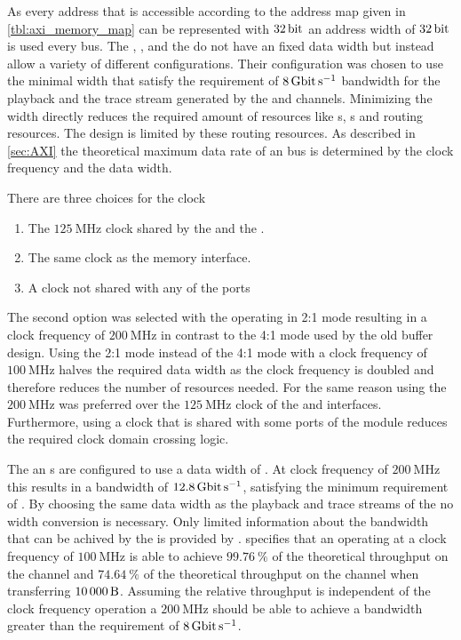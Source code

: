 As every address that is accessible according to the address map given in \autoref{tbl:axi_memory_map} can be represented with $\SI{32}{\bit}$ an address width of $\SI{32}{\bit}$ is used every \AXI{} bus.
The \AXIDMA{}, \XilinxMIG{}, \smartconnect{} and the \AXIBRAMController{} do not have an fixed \AXI{} data width but instead allow a variety of different configurations.
Their configuration was chosen to use the minimal width that satisfy the requirement of $\pbExecBandwidth{}$ bandwidth for the playback and the trace stream generated by the \MMToS{} and \SToMM{} channels. Minimizing the width directly reduces the required amount of \FPGA{} resources like \LUT{}s, \FF{}s and routing resources. The \FPGA{} design is limited by these routing resources\autocite{ref:fpga_routing_limited}.
As described in \autoref{sec:AXI} the theoretical maximum data rate of an \AXI{} bus is determined by the clock frequency and the data width.

There are three choices for the clock
\begin{enumerate}
    \item The $\SI{125}{\mega\hertz}$ clock shared by the \HostARQ{} and the \pbexec{}.
    \item The same clock as the \XilinxMIG{} memory interface.
    \item A clock not shared with any of the ports
\end{enumerate}
The second option was selected with the \XilinxMIG{} operating in 2:1 mode resulting in a clock frequency of $\SI{200}{\mega\hertz}$ in contrast to the 4:1 mode used by the old buffer design. Using the 2:1 mode instead of the 4:1 mode with a clock frequency of $\SI{100}{\mega\hertz}$ halves the required data width as the clock frequency is doubled and therefore reduces the number of \FPGA{} resources needed. For the same reason using the $\SI{200}{\mega\hertz}$ was preferred over the $\SI{125}{\mega\hertz}$ clock of the \HostARQ{} and \pbexec{} interfaces.
Furthermore, using a clock that is shared with some ports of the module reduces the required clock domain crossing logic.

The \SToMM{} an \MMToS{} \AXIStream{}s are configured to use a data width of \PhyWordSize{}. At clock frequency of $\SI{200}{\mega\hertz}$ this results in a bandwidth of $\SI{12.8}{\giga\bit\per\second}$, satisfying the minimum requirement of \pbExecBandwidth{}. By choosing the same data width as the playback and trace streams of the \pbexec{} no width conversion is necessary.
Only limited information about the bandwidth that can be achived by the \AXIDMA{} is provided by \Xilinx. \Xilinx{} specifies that an \AXIDMA{} operating at a clock frequency of $\SI{100}{\mega\hertz}$ is able to achieve $\SI{99.76}{\percent}$ of the theoretical throughput on the \MMToS{} channel and $\SI{74.64}{\percent}$ of the theoretical throughput on the \SToMM{} channel when transferring $\SI{10000}{\byte}$\autocite{ref:axidma}. Assuming the relative throughput is independent of the clock frequency operation a $\SI{200}{\mega\hertz}$ should be able to achieve a bandwidth greater than the requirement of $\pbExecBandwidth{}$.

